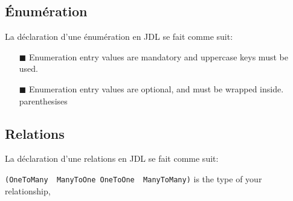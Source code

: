 \subsection{Énumération}

La déclaration d'une énumération en JDL se fait comme suit:

\begin{Shaded}
\begin{Highlighting}[]
\NormalTok{\}}
\end{Highlighting}
\end{Shaded}

\begin{itemize}
\item[$\blacksquare$]
  Enumeration entry values are mandatory and uppercase keys must be used.
\item[$\blacksquare$]
  Enumeration entry values are optional, and must be wrapped inside.
  parenthesises
\end{itemize}


\subsection{Relations}

La déclaration d'une relations en JDL se fait comme suit:

\begin{Shaded}
\begin{Highlighting}[]
\NormalTok{\}}
\end{Highlighting}
\end{Shaded}

\texttt{(OneToMany\ \textbar{}\ ManyToOne\textbar{}\ OneToOne\ \textbar{}\ ManyToMany)}
is the type of your relationship,

